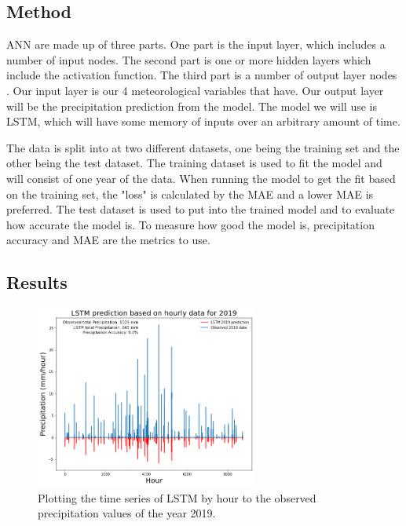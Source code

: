 \documentclass[11pt]{report}
\begin{document}
\subsection{Method}
ANN are made up of three parts. One part is the input layer, which includes a number of input nodes. The second part is one or more hidden layers which include the activation function. The third part is a number of output layer nodes \cite[]{ART}. Our input layer is our 4 meteorological variables that have. Our output layer will be the precipitation prediction from the model. The model we will use is LSTM, which will have some memory of inputs over an arbitrary amount of time. 

The data is split into at two different datasets, one being the training set and the other being the test dataset. The training dataset is used to fit the model and will consist of one year of the data. When running the model to get the fit based on the training set, the "loss" is calculated by the MAE and a lower MAE is preferred. The test dataset is used to put into the trained model and to evaluate how accurate the model is. To measure how good the model is, precipitation accuracy and MAE are the metrics to use.  


\clearpage

\subsection{Results}

\begin{figure}[th!]
	\centering
	\includegraphics[width = 0.65\textwidth]{Figures/LSTM_hour.png}
	\caption[LSTM time series to observed precipitation time series in 2019 by hour]{\label{LSTM_hour} Plotting the time series of LSTM by hour to the observed precipitation values of the year 2019.
	}
\end{figure}
\end{document}
